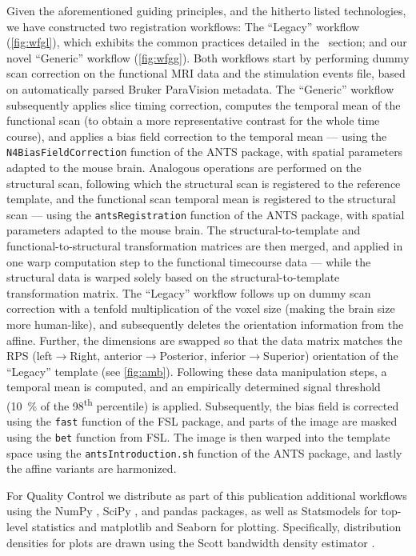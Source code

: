 Given the aforementioned guiding principles, and the hitherto listed technologies, we have constructed two registration workflows: The “Legacy” workflow (\cref{fig:wfgl}), which exhibits the common practices detailed in the ~section; and our novel “Generic” workflow (\cref{fig:wfgg}).
Both workflows start by performing dummy scan correction on the functional MRI data and the stimulation events file, based on automatically parsed Bruker ParaVision metadata.
The “Generic” workflow subsequently applies slice timing correction, computes the temporal mean of the functional scan (to obtain a more representative contrast for the whole time course), and applies a bias field correction to the temporal mean --- using the \textcolor{mg}{\texttt{N4BiasFieldCorrection}} function of the ANTS package, with spatial parameters adapted to the mouse brain.
Analogous operations are performed on the structural scan, following which the structural scan is registered to the reference template, and the functional scan temporal mean is registered to the structural scan --- using the \textcolor{mg}{\texttt{antsRegistration}} function of the ANTS package, with spatial parameters adapted to the mouse brain.
The structural-to-template and functional-to-structural transformation matrices are then merged, and applied in one warp computation step to the functional timecourse data --- while the structural data is warped solely based on the structural-to-template transformation matrix. 
The “Legacy” workflow follows up on dummy scan correction with a tenfold multiplication of the voxel size (making the brain size more human-like), and subsequently deletes the orientation information from the affine.
Further, the dimensions are swapped so that the data matrix matches the RPS (left$\rightarrow$Right, anterior$\rightarrow$Posterior, inferior$\rightarrow$Superior) orientation of the “Legacy” template (see \cref{fig:amb}).
Following these data manipulation steps, a temporal mean is computed, and an empirically determined signal threshold (\SI{10}{\percent} of the 98\textsuperscript{th} percentile) is applied.
Subsequently, the bias field is corrected using the \textcolor{mg}{\texttt{fast}} function of the FSL package, and parts of the image are masked using the \textcolor{mg}{\texttt{bet}} function from FSL. 
The image is then warped into the template space using the \textcolor{mg}{\texttt{antsIntroduction.sh}} function of the ANTS package, and lastly the affine variants are harmonized.

For Quality Control we distribute as part of this publication additional workflows using the NumPy \cite{numpy}, SciPy \cite{scipy}, and pandas \cite{pandas} packages, as well as Statsmodels \cite{statsmodels} for top-level statistics and matplotlib \cite{matplotlib} and Seaborn \cite{seaborn} for plotting.
Specifically, distribution densities for plots are drawn using the Scott bandwidth density estimator \cite{Scott1979}.

